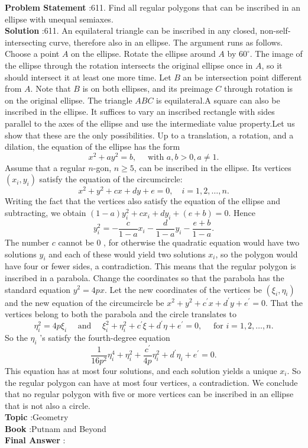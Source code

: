 \documentclass[10pt]{article}
\begin{document}
\textbf{Problem Statement} :611. Find all regular polygons that can be inscribed in an ellipse with unequal semiaxes.\\
\textbf{Solution} :611. An equilateral triangle can be inscribed in any closed, non-self-intersecting curve, therefore also in an ellipse. The argument runs as follows. Choose a point $A$ on the ellipse. Rotate the ellipse around $A$ by $60^{\circ}$. The image of the ellipse through the rotation intersects the original ellipse once in $A$, so it should intersect it at least one more time. Let $B$ an be intersection point different from $A$. Note that $B$ is on both ellipses, and its preimage $C$ through rotation is on the original ellipse. The triangle $A B C$ is equilateral.A square can also be inscribed in the ellipse. It suffices to vary an inscribed rectangle with sides parallel to the axes of the ellipse and use the intermediate value property.Let us show that these are the only possibilities. Up to a translation, a rotation, and a dilation, the equation of the ellipse has the form$$ x^{2}+a y^{2}=b, \quad \text { with } a, b>0, a \neq 1 . $$Assume that a regular $n$-gon, $n \geq 5$, can be inscribed in the ellipse. Its vertices $\left(x_{i}, y_{i}\right)$ satisfy the equation of the circumcircle: $$ x^{2}+y^{2}+c x+d y+e=0, \quad i=1,2, \ldots, n . $$Writing the fact that the vertices also satisfy the equation of the ellipse and subtracting, we obtain $(1-a) y_{i}^{2}+c x_{i}+d y_{i}+(e+b)=0$. Hence$$ y_{i}^{2}=-\frac{c}{1-a} x_{i}-\frac{d}{1-a} y_{i}-\frac{e+b}{1-a} . $$The number $c$ cannot be 0 , for otherwise the quadratic equation would have two solutions $y_{i}$ and each of these would yield two solutions $x_{i}$, so the polygon would have four or fewer sides, a contradiction. This means that the regular polygon is inscribed in a parabola. Change the coordinates so that the parabola has the standard equation $y^{2}=4 p x$. Let the new coordinates of the vertices be $\left(\xi_{i}, \eta_{i}\right)$ and the new equation of the circumcircle be $x^{2}+y^{2}+c^{\prime} x+d^{\prime} y+e^{\prime}=0$. That the vertices belong to both the parabola and the circle translates to$$ \eta_{i}^{2}=4 p \xi_{i} \quad \text { and } \quad \xi_{i}^{2}+\eta_{i}^{2}+c^{\prime} \xi+d^{\prime} \eta+e^{\prime}=0, \quad \text { for } i=1,2, \ldots, n . $$So the $\eta_{i}$ 's satisfy the fourth-degree equation$$ \frac{1}{16 p^{2}} \eta_{i}^{4}+\eta_{i}^{2}+\frac{c^{\prime}}{4 p} \eta_{i}^{2}+d^{\prime} \eta_{i}+e^{\prime}=0 . $$This equation has at most four solutions, and each solution yields a unique $x_{i}$. So the regular polygon can have at most four vertices, a contradiction. We conclude that no regular polygon with five or more vertices can be inscribed in an ellipse that is not also a circle.\\
\textbf{Topic} :Geometry\\
\textbf{Book} :Putnam and Beyond\\
\textbf{Final Answer} :\\
\end{document}
